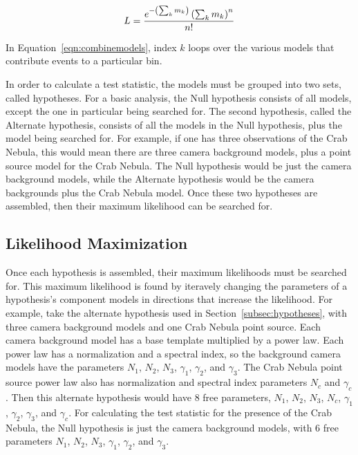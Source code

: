   \begin{equation}\label{eqn:combinemodels}
    L = \frac{e^{- \left ( \sum_k m_k \right ) } \left ( \sum_k m_k \right )^n}{n!}
  \end{equation}

  In Equation~\ref{eqn:combinemodels}, index $k$ loops over the various models that contribute events to a particular bin.
  
  In order to calculate a test statistic, the models must be grouped into two sets, called hypotheses.
  For a basic analysis, the Null hypothesis consists of all models, except the one in particular being searched for.
  The second hypothesis, called the Alternate hypothesis, consists of all the models in the Null hypothesis, plus the model being searched for.
  For example, if one has three observations of the Crab Nebula, this would mean there are three camera background models, plus a point source model for the Crab Nebula.
  The Null hypothesis would be just the camera background models, while the Alternate hypothesis would be the camera backgrounds plus the Crab Nebula model.
  Once these two hypotheses are assembled, then their maximum likelihood can be searched for.
  
  \subsection{Likelihood Maximization}\label{subsec:likemax}
  Once each hypothesis is assembled, their maximum likelihoods must be searched for.
  This maximum likelihood is found by iteravely changing the parameters of a hypothesis's component models in directions that increase the likelihood.
  For example, take the alternate hypothesis used in Section~\ref{subsec:hypotheses}, with three camera background models and one Crab Nebula point source.
  Each camera background model has a base template multiplied by a power law.
  Each power law has a normalization and a spectral index, so the background camera models have the parameters $N_1$, $N_2$, $N_3$, $\gamma_1$, $\gamma_2$, and $\gamma_3$.
  The Crab Nebula point source power law also has normalization and spectral index parameters $N_c$ and $\gamma_c$.
  Then this alternate hypothesis would have 8 free parameters, $N_1$, $N_2$, $N_3$, $N_c$, $\gamma_1$, $\gamma_2$, $\gamma_3$, and $\gamma_c$.
  For calculating the test statistic for the presence of the Crab Nebula, the Null hypothesis is just the camera background models, with 6 free parameters $N_1$, $N_2$, $N_3$, $\gamma_1$, $\gamma_2$, and $\gamma_3$.
  
